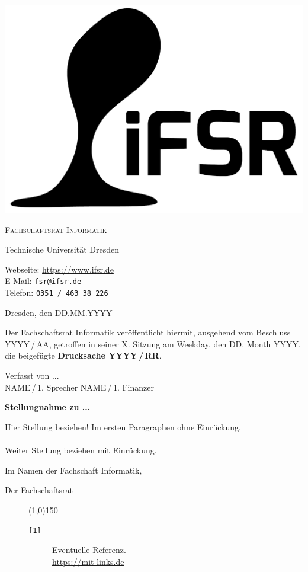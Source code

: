 \documentclass[a4paper]{article}
\begin{document}
\begin{titlepage}
	\centering
	\includegraphics[width=.3\textwidth]{LogoSW}

	\vspace{1cm}
	{\scshape \LARGE Fachschaftsrat Informatik\par}
	Technische Universität Dresden

	\vspace{1cm}
	Webseite: \url{https://www.ifsr.de} \\
	E-Mail: \texttt{fsr@ifsr.de} \\
	Telefon: \texttt{0351\,/\,463 38 226}

	\parbox{.8\textwidth}{	
		\vspace{1cm}
		\hfill Dresden, den DD.MM.YYYY %
		
	\vspace{1cm}
		Der Fachschaftsrat Informatik veröffentlicht hiermit, ausgehend vom Beschluss YYYY\,/\,AA, getroffen in seiner X. Sitzung am Weekday, den DD. Month YYYY, die beigefügte \textbf{Drucksache YYYY\,/\,RR}.\flushleft
		
		Verfasst von ...\\

\vspace{2cm}
	NAME\,/\,1. Sprecher \hfill NAME\,/\,1. Finanzer\\
	\vspace{.6cm}}

\end{titlepage}

\newpage{}

\begin{center}
    \textbf{\Large Stellungnahme zu ...}
\end{center}


Hier Stellung beziehen! Im ersten Paragraphen ohne Einrückung.

\paragraph{} Weiter Stellung beziehen mit Einrückung.

\vspace{1cm}
Im Namen der Fachschaft Informatik,

Der Fachschaftsrat



\begin{figure}[b]
\footnotesize
\line(1,0){150}
\begin{description}
	\item [\texttt{[1]}] Eventuelle Referenz.\\
		\url{https://mit-links.de}
\end{description}
\end{figure}
\end{document}
